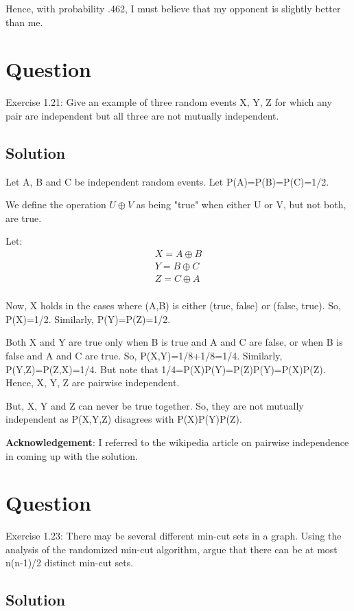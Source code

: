 \documentclass[10pt]{article}
\begin{document}
Hence, with probability .462, I must believe that my opponent is slightly better than me.

\section{Question}

Exercise 1.21: Give an example of three random events X, Y, Z for which any pair are independent but all three are not mutually independent.

\subsection{Solution}

Let A, B and C be independent random events. Let P(A)=P(B)=P(C)=1/2.

We define the operation $U \oplus V$ as being "true" when either U or V, but not both, are true.

Let:
\begin{eqnarray}
X = A \oplus B\\
Y = B \oplus C\\
Z = C \oplus A\\
\end{eqnarray}

Now, X holds in the cases where (A,B) is either (true, false) or (false, true). So, P(X)=1/2. Similarly, P(Y)=P(Z)=1/2.

Both X and Y are true only when B is true and A and C are false, or when B is false and A and C are true. So, P(X,Y)=1/8+1/8=1/4. Similarly, P(Y,Z)=P(Z,X)=1/4. But note that 1/4=P(X)P(Y)=P(Z)P(Y)=P(X)P(Z). Hence, X, Y, Z are pairwise independent.

But, X, Y and Z can never be true together. So, they are not mutually independent as P(X,Y,Z) disagrees with P(X)P(Y)P(Z).

\textbf{Acknowledgement}: I referred to the wikipedia article on pairwise independence \cite{wikiPairwiseIndependence} in coming up with the solution.

\section{Question}

Exercise 1.23: There may be several different min-cut sets in a graph. Using the analysis of the randomized min-cut algorithm, argue that there can be at most n(n-1)/2 distinct min-cut sets.

\subsection{Solution}
\end{document}
